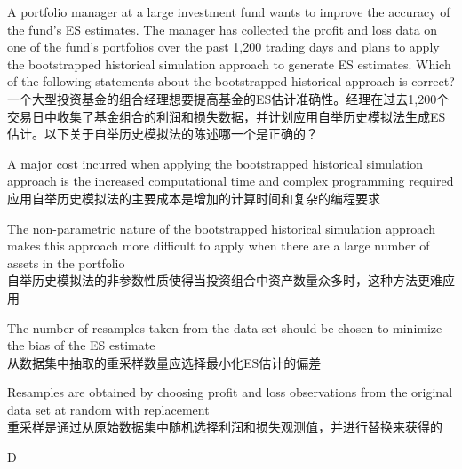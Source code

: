 \documentclass{article}
\newcounter{question} %
\begin{document}
\begin{question}
    A portfolio manager at a large investment fund wants to improve the accuracy of the fund's ES estimates. The manager has collected the profit and loss data on one of the fund's portfolios over the past 1,200 trading days and plans to apply the bootstrapped historical simulation approach to generate ES estimates. Which of the following statements about the bootstrapped historical approach is correct?
    \\一个大型投资基金的组合经理想要提高基金的ES估计准确性。经理在过去1,200个交易日中收集了基金组合的利润和损失数据，并计划应用自举历史模拟法生成ES估计。以下关于自举历史模拟法的陈述哪一个是正确的？
\end{question}

\begin{choices}
    \item A major cost incurred when applying the bootstrapped historical simulation approach is the increased computational time and complex programming required\\
        应用自举历史模拟法的主要成本是增加的计算时间和复杂的编程要求
    \item The non-parametric nature of the bootstrapped historical simulation approach makes this approach more difficult to apply when there are a large number of assets in the portfolio\\
        自举历史模拟法的非参数性质使得当投资组合中资产数量众多时，这种方法更难应用
    \item The number of resamples taken from the data set should be chosen to minimize the bias of the ES estimate\\
        从数据集中抽取的重采样数量应选择最小化ES估计的偏差
    \item Resamples are obtained by choosing profit and loss observations from the original data set at random with replacement\\
        重采样是通过从原始数据集中随机选择利润和损失观测值，并进行替换来获得的
\end{choices}

\begin{correctanswer}
    D
\end{correctanswer}
\end{document}
